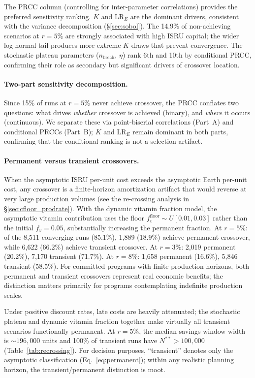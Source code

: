 \documentclass[preprint,12pt]{elsarticle}
\begin{document}
The PRCC column (controlling for inter-parameter correlations) provides the preferred sensitivity ranking. $K$ and LR$_E$ are the dominant drivers, consistent with the variance decomposition (\S\ref{sec:sobol}). The 14.9\% of non-achieving scenarios at $r = 5\%$ are strongly associated with high ISRU capital; the wider log-normal tail produces more extreme $K$ draws that prevent convergence. The stochastic plateau parameters ($n_{\mathrm{break}}$, $\eta$) rank 6th and 10th by conditional PRCC, confirming their role as secondary but significant drivers of crossover location.

\paragraph{Two-part sensitivity decomposition.} Since 15\% of runs at $r = 5\%$ never achieve crossover, the PRCC conflates two questions: what drives \emph{whether} crossover is achieved (binary), and \emph{where} it occurs (continuous). We separate these via point-biserial correlations (Part~A) and conditional PRCCs (Part~B); $K$ and LR$_E$ remain dominant in both parts, confirming that the conditional ranking is not a selection artifact.

\paragraph{Permanent versus transient crossovers.} When the asymptotic ISRU per-unit cost exceeds the asymptotic Earth per-unit cost, any crossover is a finite-horizon amortization artifact that would reverse at very large production volumes (see the re-crossing analysis in \S\ref{sec:cfloor_prodrate}). With the dynamic vitamin fraction model, the asymptotic vitamin contribution uses the floor $f_v^{\mathrm{floor}} \sim U[0.01, 0.03]$ rather than the initial $f_v = 0.05$, substantially increasing the permanent fraction. At $r = 5\%$: of the 8{,}511 converging runs (85.1\%), 1{,}889 (18.9\%) achieve permanent crossover, while 6{,}622 (66.2\%) achieve transient crossover. At $r = 3\%$: 2{,}019 permanent (20.2\%), 7{,}170 transient (71.7\%). At $r = 8\%$: 1{,}658 permanent (16.6\%), 5{,}846 transient (58.5\%). For committed programs with finite production horizons, both permanent and transient crossovers represent real economic benefits; the distinction matters primarily for programs contemplating indefinite production scales.

Under positive discount rates, late costs are heavily attenuated; the stochastic plateau and dynamic vitamin fraction together make virtually all transient scenarios functionally permanent. At $r = 5\%$, the median savings window width is ${\sim}196{,}000$ units and 100\% of transient runs have $N^{**} > 100{,}000$ (Table~\ref{tab:recrossing}). For decision purposes, ``transient'' denotes only the asymptotic classification (Eq.~\ref{eq:permanent}); within any realistic planning horizon, the transient/permanent distinction is moot.
\end{document}

